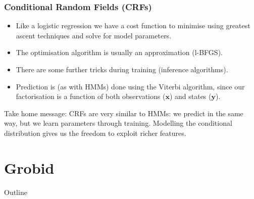 \documentclass{beamer}
\begin{document}


\begin{frame}
\frametitle{Conditional Random Fields (CRFs)}
\begin{itemize}
\item Like a logistic regression we have a cost function to minimise using greatest ascent techniques and solve for model parameters.
\item The optimisation algorithm is usually an approximation (l-BFGS).
\item There are some further tricks during training (inference algorithms).
\item Prediction is (as with HMMs) done using the Viterbi algorithm, since our factorisation is a function of both observations ($\mathbf{x}$) and states ($\mathbf{y}$).
\end{itemize}
Take home message: CRFs are very similar to HMMs: we predict in the same way, but we learn parameters through training. Modelling the conditional distribution gives us the freedom to exploit richer features.
\end{frame}


\section{Grobid}
\begin{frame}[noframenumbering]{Outline}
\tableofcontents[currentsection]
\end{frame}

\end{document}

